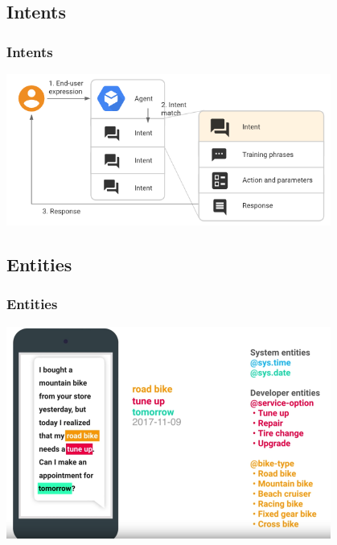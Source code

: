 \documentclass{beamer}
\begin{document}

\subsection{Intents}

\begin{frame}
\frametitle{Intents}
\begin{center}
\includegraphics[width=0.8\textwidth]{pictures/intent.png}

\end{center}
\end{frame}


\subsection{Entities}

\begin{frame}
\frametitle{Entities}
\begin{center}
\includegraphics[width=0.8\textwidth]{pictures/entities2.png}
\end{center}
\end{frame}

\end{document}
